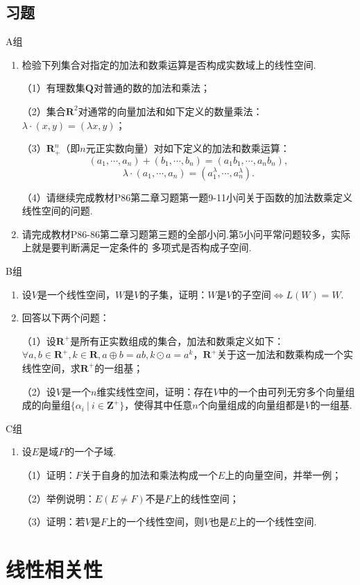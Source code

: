 \subsection{习题}
\centerline{\heiti A组}
\begin{enumerate}
	\item 检验下列集合对指定的加法和数乘运算是否构成实数域上的线性空间.
	
	（1）有理数集$\mathbf{Q}$对普通的数的加法和乘法；

	（2）集合$\mathbf{R}^2$对通常的向量加法和如下定义的数量乘法：$\lambda\cdot(x,y)=(\lambda x,y)$；

	（3）$\mathbf{R}_+^n$（即$n$元正实数向量）对如下定义的加法和数乘运算：
	$$(a_1,\cdots,a_n)+(b_1,\cdots,b_n)=(a_1b_1,\cdots,a_nb_n),$$
	$$\lambda\cdot(a_1,\cdots,a_n)=(a_1^\lambda,\cdots,a_n^\lambda).$$

	（4）请继续完成教材P86第二章习题第一题9-11小问关于函数的加法数乘定义线性空间的问题.
	\item 请完成教材P86-86第二章习题第三题的全部小问.第5小问平常问题较多，实际上就是要判断满足一定条件的
	多项式是否构成子空间.
\end{enumerate}
\centerline{\heiti B组}
\begin{enumerate}
	\item 设$V$是一个线性空间，$W$是$V$的子集，证明：$W$是$V$的子空间$\iff L(W)=W$.
	\item 回答以下两个问题：

	（1）设$\mathbf{R}^+$是所有正实数组成的集合，加法和数乘定义如下：$\forall a,b \in \mathbf{R}^+,k\in \mathbf{R},a\oplus b = ab, k\odot a = a^k$，$\mathbf{R}^+$关于这一加法和数乘构成一个实线性空间，求$\mathbf{R}^+$的一组基；

	（2）设$V$是一个$n$维实线性空间，证明：存在$V$中的一个由可列无穷多个向量组成的向量组$\{\alpha_i\ |\ i\in\mathbf{Z}^+\}$，使得其中任意$n$个向量组成的向量组都是$V$的一组基.
\end{enumerate}
\centerline{\heiti C组}
\begin{enumerate}
	\item 设$E$是域$F$的一个子域.
	
	（1）证明：$F$关于自身的加法和乘法构成一个$E$上的向量空间，并举一例；

	（2）举例说明：$E(E\neq F)$不是$F$上的线性空间；

	（3）证明：若$V$是$F$上的一个线性空间，则$V$也是$E$上的一个线性空间.
\end{enumerate}

\section{线性相关性}

